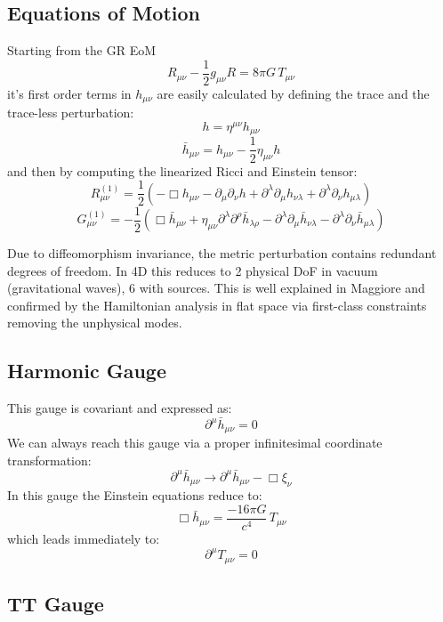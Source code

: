 \documentclass[12pt,a4paper]{article}
\begin{document}
\subsection*{Equations of Motion}
Starting from the GR EoM
\[
R_{\mu\nu} - \frac{1}{2}g_{\mu\nu}R = 8\pi G\, T_{\mu\nu}
\]
it's first order terms in $h_{\mu\nu}$ are easily calculated by defining the trace and the trace-less perturbation:
\[
h = \eta^{\mu\nu} h_{\mu\nu}
\]
\[
\bar{h}_{\mu\nu} = h_{\mu\nu} - \frac{1}{2}\eta_{\mu\nu} h
\]
and then by computing the linearized Ricci and Einstein tensor:
\[
R_{\mu\nu}^{(1)} = \frac{1}{2}\left( -\Box h_{\mu\nu} - \partial_\mu \partial_\nu h + \partial^\lambda \partial_\mu h_{\nu\lambda} + \partial^\lambda \partial_\nu h_{\mu\lambda} \right)
\]
\[
G_{\mu\nu}^{(1)} = -\frac{1}{2}\left( \Box \bar{h}_{\mu\nu} + \eta_{\mu\nu} \partial^\lambda \partial^\rho \bar{h}_{\lambda\rho} - \partial^\lambda \partial_\mu \bar{h}_{\nu\lambda} - \partial^\lambda \partial_\nu \bar{h}_{\mu\lambda} \right)
\]

Due to diffeomorphism invariance, the metric perturbation contains redundant degrees of freedom. In 4D this reduces to 2 physical DoF in vacuum (gravitational waves), 6 with sources. This is well explained in Maggiore and confirmed by the Hamiltonian analysis in flat space via first-class constraints removing the unphysical modes.


 
\subsection*{Harmonic Gauge}

This gauge is covariant and expressed as:
\[
\boxed{\partial^\mu\bar{h}_{\mu\nu} = 0}
\]
We can always reach this gauge via a proper infinitesimal coordinate transformation:
\[
\partial^\mu \bar{h}_{\mu\nu} \to \partial^\mu \bar{h}_{\mu\nu} - \Box \xi_\nu
\]
In this gauge the Einstein equations reduce to:
\[
\Box \bar{h}_{\mu\nu} = \frac{-16\pi G}{c^4}\, T_{\mu\nu}
\]
which leads immediately to:
\[
\boxed{\partial^\mu T_{\mu\nu} = 0}
\]

\subsection*{TT Gauge}
\end{document}
